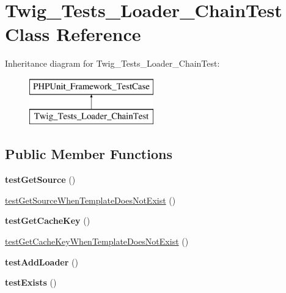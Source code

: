 \hypertarget{classTwig__Tests__Loader__ChainTest}{}\section{Twig\+\_\+\+Tests\+\_\+\+Loader\+\_\+\+Chain\+Test Class Reference}
\label{classTwig__Tests__Loader__ChainTest}
Inheritance diagram for Twig\+\_\+\+Tests\+\_\+\+Loader\+\_\+\+Chain\+Test\+:\begin{figure}[H]
\begin{center}
\leavevmode
\includegraphics[height=2.000000cm]{classTwig__Tests__Loader__ChainTest}
\end{center}
\end{figure}
\subsection*{Public Member Functions}
\begin{DoxyCompactItemize}
\item 
{\bfseries test\+Get\+Source} ()\hypertarget{classTwig__Tests__Loader__ChainTest_aca111c8883b195d8a5ed440847de5e7d}{}\label{classTwig__Tests__Loader__ChainTest_aca111c8883b195d8a5ed440847de5e7d}

\item 
\hyperlink{classTwig__Tests__Loader__ChainTest_a8f2e1f3c91639f70a6b0459013542d94}{test\+Get\+Source\+When\+Template\+Does\+Not\+Exist} ()
\item 
{\bfseries test\+Get\+Cache\+Key} ()\hypertarget{classTwig__Tests__Loader__ChainTest_af93a3536882f87bc36dd6f54956f334e}{}\label{classTwig__Tests__Loader__ChainTest_af93a3536882f87bc36dd6f54956f334e}

\item 
\hyperlink{classTwig__Tests__Loader__ChainTest_afa1097720c5e913478de513681c0da2f}{test\+Get\+Cache\+Key\+When\+Template\+Does\+Not\+Exist} ()
\item 
{\bfseries test\+Add\+Loader} ()\hypertarget{classTwig__Tests__Loader__ChainTest_acddb27a9630127212feb3bdee072db22}{}\label{classTwig__Tests__Loader__ChainTest_acddb27a9630127212feb3bdee072db22}

\item 
{\bfseries test\+Exists} ()\hypertarget{classTwig__Tests__Loader__ChainTest_a3871e1e6e2ef6805b04831d93848e806}{}\label{classTwig__Tests__Loader__ChainTest_a3871e1e6e2ef6805b04831d93848e806}

\end{DoxyCompactItemize}


